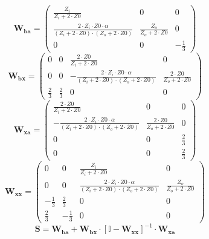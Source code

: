 \[ \mathbf{W_{ba}} = \left(\begin{smallmatrix} \frac{Z_i}{Z_i+2\cdot
Z0} & 0 & 0 \\ \frac{2\cdot Z_i\cdot Z0\cdot \alpha}{\left(Z_i+2\cdot
Z0\right)\cdot\left(Z_o+2\cdot Z0\right)} & \frac{Z_o}{Z_o+2\cdot Z0}
& 0 \\ 0 & 0 & -\frac{1}{3} \end{smallmatrix}\right) \]
\[ \mathbf{W_{bx}} = \left(\begin{smallmatrix} 0 & 0 & \frac{2\cdot
Z0}{Z_i+2\cdot Z0} & 0 \\ 0 & 0 & -\frac{2\cdot Z_i\cdot Z0\cdot
\alpha}{\left(Z_i+2\cdot Z0\right)\cdot\left(Z_o+2\cdot Z0\right)} &
\frac{2\cdot Z0}{Z_o+2\cdot Z0} \\ \frac{2}{3} & \frac{2}{3} & 0 & 0
\end{smallmatrix}\right) \]
\[ \mathbf{W_{xa}} = \left(\begin{smallmatrix} \frac{2\cdot
Z0}{Z_i+2\cdot Z0} & 0 & 0 \\ -\frac{2\cdot Z_i\cdot Z0\cdot
\alpha}{\left(Z_i+2\cdot Z0\right)\cdot\left(Z_o+2\cdot Z0\right)} &
\frac{2\cdot Z0}{Z_o+2\cdot Z0} & 0 \\ 0 & 0 & \frac{2}{3} \\ 0 & 0 &
\frac{2}{3} \end{smallmatrix}\right) \]
\[ \mathbf{W_{xx}} = \left(\begin{smallmatrix} 0 & 0 &
\frac{Z_i}{Z_i+2\cdot Z0} & 0 \\ 0 & 0 & \frac{2\cdot Z_i\cdot Z0\cdot
\alpha}{\left(Z_i+2\cdot Z0\right)\cdot\left(Z_o+2\cdot Z0\right)} &
\frac{Z_o}{Z_o+2\cdot Z0} \\ -\frac{1}{3} & \frac{2}{3} & 0 & 0 \\
\frac{2}{3} & -\frac{1}{3} & 0 & 0 \end{smallmatrix}\right) \]
\[ \mathbf{S}=\mathbf{W_{ba}}+\mathbf{W_{bx}}\cdot\left[ \mathbb{I}
-\mathbf{W_{xx}}\right]^{-1}\cdot\mathbf{W_{xa}} \]
